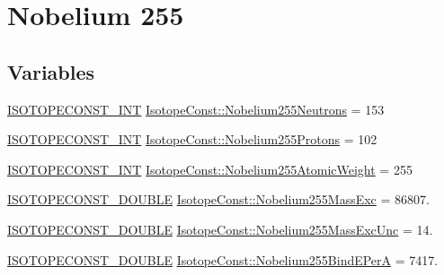 \hypertarget{group___isotope_const-_nobelium-_no255}{}\section{Nobelium 255}
\label{group___isotope_const-_nobelium-_no255}
\subsection*{Variables}
\begin{DoxyCompactItemize}
\item 
\mbox{\hyperlink{group___isotope_const-_macros_ga5f18360b3e99483a35c32d789e62621c}{I\+S\+O\+T\+O\+P\+E\+C\+O\+N\+S\+T\+\_\+\+I\+NT}} \mbox{\hyperlink{group___isotope_const-_nobelium-_no255_ga22f9ebcfe1d114261315a94a97009fe1}{Isotope\+Const\+::\+Nobelium255\+Neutrons}} = 153
\item 
\mbox{\hyperlink{group___isotope_const-_macros_ga5f18360b3e99483a35c32d789e62621c}{I\+S\+O\+T\+O\+P\+E\+C\+O\+N\+S\+T\+\_\+\+I\+NT}} \mbox{\hyperlink{group___isotope_const-_nobelium-_no255_ga2e753f76ee4c26ed7b75cd5136ed4def}{Isotope\+Const\+::\+Nobelium255\+Protons}} = 102
\item 
\mbox{\hyperlink{group___isotope_const-_macros_ga5f18360b3e99483a35c32d789e62621c}{I\+S\+O\+T\+O\+P\+E\+C\+O\+N\+S\+T\+\_\+\+I\+NT}} \mbox{\hyperlink{group___isotope_const-_nobelium-_no255_ga00d729594fc87b269e3731daa9a0a108}{Isotope\+Const\+::\+Nobelium255\+Atomic\+Weight}} = 255
\item 
\mbox{\hyperlink{group___isotope_const-_macros_ga8f45a7272ce02c0b4c65c44636ed719a}{I\+S\+O\+T\+O\+P\+E\+C\+O\+N\+S\+T\+\_\+\+D\+O\+U\+B\+LE}} \mbox{\hyperlink{group___isotope_const-_nobelium-_no255_gadf03b0ec0594ba320b411582ab9a04a8}{Isotope\+Const\+::\+Nobelium255\+Mass\+Exc}} = 86807.
\item 
\mbox{\hyperlink{group___isotope_const-_macros_ga8f45a7272ce02c0b4c65c44636ed719a}{I\+S\+O\+T\+O\+P\+E\+C\+O\+N\+S\+T\+\_\+\+D\+O\+U\+B\+LE}} \mbox{\hyperlink{group___isotope_const-_nobelium-_no255_gab05833f671e28e3e7f5b72bb71414aab}{Isotope\+Const\+::\+Nobelium255\+Mass\+Exc\+Unc}} = 14.
\item 
\mbox{\hyperlink{group___isotope_const-_macros_ga8f45a7272ce02c0b4c65c44636ed719a}{I\+S\+O\+T\+O\+P\+E\+C\+O\+N\+S\+T\+\_\+\+D\+O\+U\+B\+LE}} \mbox{\hyperlink{group___isotope_const-_nobelium-_no255_ga0083fccfe192943f4fb19c70deb1c777}{Isotope\+Const\+::\+Nobelium255\+Bind\+E\+PerA}} = 7417.
\item 

\end{DoxyCompactItemize}
